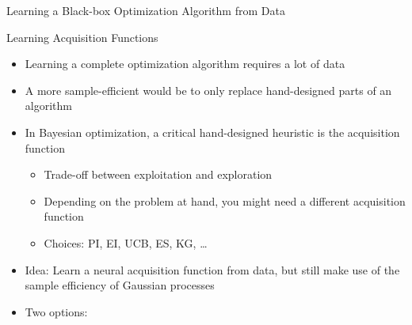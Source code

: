 \begin{frame}[c]{Learning a Black-box Optimization Algorithm from Data}
{{%

    }
}

\end{frame}
\begin{frame}[c]{Learning Acquisition Functions}

\begin{itemize}
	\item Learning a complete optimization algorithm  \alert{requires a lot of data}
	\item A more \alert{sample-efficient} would be to \alert{only replace hand-designed parts} of an algorithm

\bigskip
\pause
	\item In Bayesian optimization, a critical hand-designed heuristic is the acquisition function
	\begin{itemize}
		\item Trade-off between exploitation and exploration
		\item Depending on the problem at hand, you might need a different acquisition function
		\pause
		\item Choices: PI, EI, UCB, ES, KG, \dots 
	\end{itemize}
\pause
\bigskip

    \item \alert{Idea:} Learn a \alert{neural acquisition function} from data, but still make use of the sample efficiency of Gaussian processes 

\pause
\medskip
    \item Two options:

\end{itemize}


\end{frame}

